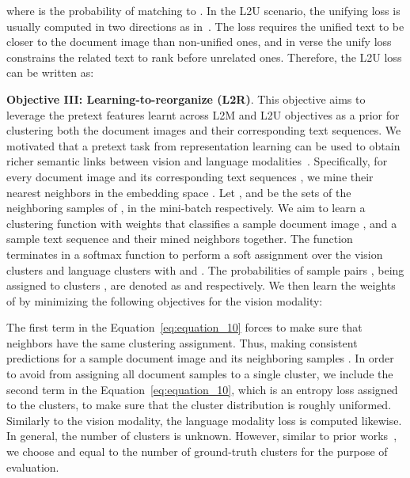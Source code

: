\documentclass[preprint,review,12pt]{elsarticle}
\begin{document}
where  is the probability of matching  to . 
In the L2U scenario, the unifying loss is usually computed in two directions as in~\cite{chen2019closer, wang2018learning, liu2017learning}. The  loss requires the unified text to be closer to the document image than non-unified ones, and in verse the  unify loss constrains the related text to rank before unrelated ones. Therefore, the L2U loss can be written as:

\noindent\textbf{Objective III: Learning-to-reorganize (L2R)}.
This objective aims to leverage the pretext features learnt across L2M and L2U objectives as a prior for clustering both the document images and their corresponding text sequences. We motivated that a pretext task from representation learning can be used to obtain richer semantic links between vision and language modalities~\cite{van2020scan}. 
Specifically, for every document image  and its corresponding text sequences , we mine their  nearest neighbors in the embedding space . Let , and  be the sets of the neighboring samples of ,  in the mini-batch  respectively. We aim to learn a clustering function  with weights  that classifies a sample document image , and a sample text sequence  and their mined neighbors   together. The function  terminates in a softmax function to perform a soft assignment over the vision clusters  and language clusters  with  and . The probabilities of sample pairs ,  being assigned to clusters ,  are denoted as  and  respectively. We then learn the weights of  by minimizing the following objectives for the vision modality:

The first term in the Equation~\ref{eq:equation_10} forces  to make sure that neighbors have the same clustering assignment. Thus, making consistent predictions for a sample document image  and its neighboring samples . 
In order to avoid  from assigning all document samples to a single cluster, we include the second term in the Equation~\ref{eq:equation_10}, which is an entropy loss assigned to the clusters, to make sure that the cluster distribution  is roughly uniformed. Similarly to the vision modality, the language modality loss  is computed likewise.
In general, the number of clusters is unknown. However, similar to prior works~\cite{li2021selfdoc}, we choose  and  equal to the number of ground-truth clusters for the purpose of evaluation. 
\end{document}

